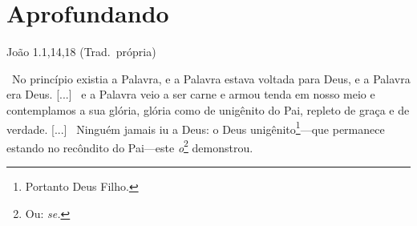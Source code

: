 \documentclass[12pt,aspectratio=169]{beamer}
\newcommand{\ver}[1]{%
    \raisebox{0.50ex}{%
        \scalebox{1.1}{%
            \pmb{\textbf{\textcolor{BSpbg}{#1}}}%
        }%
    }%
}
\newcommand{\QUOTE}[1]{%
    \par\noindent\hspace*{0.1\linewidth}%
    \begin{minipage}{0.8\linewidth}%
        \linespread{1.35}\large{#1}%
    \end{minipage}%
}
\newcommand{\YEL}[1]{{\textcolor{TXyel}{#1}}}
\newcommand{\MAG}[1]{{\textcolor{TXmag}{#1}}}
\newcommand{\BRI}[1]{{\textcolor{BSpbg}{#1}}}   %
\begin{document}
\section{Aprofundando}

    \begin{frame}{João 1.1,14,18 (Trad.~própria)}
        \QUOTE{%
            \normalsize
            \ver{1}~No    princípio    existia    \MAG{a
            Palavra}, e \MAG{a Palavra}  estava  voltada
            para \BRI{Deus}, e \MAG{a Palavra era Deus}.
            [...] \ver{14}~e \MAG{a Palavra veio  a  ser
            carne}  e  armou  tenda  em  nosso  meio   e
            contemplamos     a     sua     \YEL{glória},
            \YEL{glória} como de unigênito do \BRI{Pai},
            repleto de \YEL{graça} e  de  \YEL{verdade}.
            [...] \ver{18}~Ninguém  jamais  \pmb{v}iu  a
            \BRI{Deus}:           o            \MAG{Deus
            unigênito}\footnote{Portanto       \MAG{Deus
            Filho}.}---que    permanece    estando    no
            recôndito    do    \BRI{Pai}---este     {\it
            \BRI{o}}\footnote{Ou:    {\it    \BRI{se}.}}
            demonstrou.
        }
    \end{frame}

\end{document}
